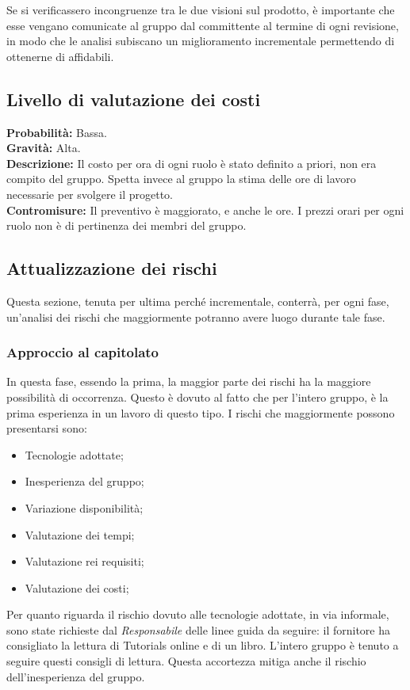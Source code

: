 \documentclass[a4paper]{article}
\begin{document}
				Se si verificassero incongruenze tra le due visioni sul prodotto, è importante che esse vengano comunicate 
				al gruppo dal committente al termine di ogni revisione, in modo che le analisi subiscano un miglioramento 
				incrementale permettendo di ottenerne di affidabili.
		\subsection{Livello di valutazione dei costi}
			\textbf{Probabilità:} Bassa. 
			\\
			\textbf{Gravità:} Alta.
			\\
			\textbf{Descrizione:} Il costo per ora di ogni ruolo è stato definito a priori, non era compito del gruppo. Spetta invece al 
				gruppo la stima delle ore di lavoro necessarie per svolgere il progetto.
			\\
			\textbf{Contromisure:} Il preventivo è maggiorato, e anche le ore. I prezzi orari per ogni ruolo non è di pertinenza dei membri 
				del gruppo.
		\subsection{Attualizzazione dei rischi}
			Questa sezione, tenuta per ultima perché incrementale, conterrà, per ogni fase, un'analisi dei rischi che maggiormente potranno
			avere luogo durante tale fase.
			\subsubsection{Approccio al capitolato}
				In questa fase, essendo la prima, la maggior parte dei rischi ha la maggiore possibilità di occorrenza. Questo è 
				dovuto al fatto che per l'intero gruppo, è la prima esperienza in un lavoro di questo tipo. I rischi che maggiormente 
				possono presentarsi sono:
				\begin{itemize}
					\item Tecnologie adottate;
					\item Inesperienza del gruppo;
					\item Variazione disponibilità;
					\item Valutazione dei tempi;
					\item Valutazione rei requisiti;
					\item Valutazione dei costi;
				\end{itemize}
				Per quanto riguarda il rischio dovuto alle tecnologie adottate, in via informale, sono state richieste dal \emph{Responsabile}
				delle linee guida da seguire: il fornitore ha consigliato la lettura di Tutorials online e di un libro. L'intero gruppo è tenuto 
				a seguire questi consigli di lettura. Questa accortezza mitiga anche il rischio dell'inesperienza del gruppo.
				
\end{document}
